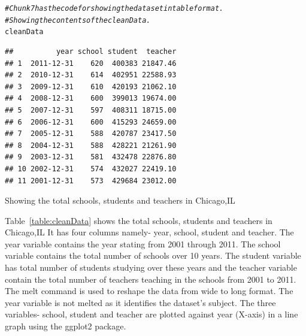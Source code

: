 \documentclass{article}\usepackage[]{graphicx}\usepackage[]{color}
\makeatletter
\newcommand{\hlcom}[1]{\textcolor[rgb]{0.678,0.584,0.686}{\textit{#1}}}%
\newcommand{\hlstd}[1]{\textcolor[rgb]{0.345,0.345,0.345}{#1}}%
\newenvironment{kframe}{%
 \def\at@end@of@kframe{}%
 \ifinner\ifhmode%
  \def\at@end@of@kframe{\end{minipage}}%
  \begin{minipage}{\columnwidth}%
 \fi\fi%
 \def\FrameCommand##1{\hskip\@totalleftmargin \hskip-\fboxsep
 \colorbox{shadecolor}{##1}\hskip-\fboxsep
     \hskip-\linewidth \hskip-\@totalleftmargin \hskip\columnwidth}%
 \MakeFramed {\advance\hsize-\width
   \@totalleftmargin\z@ \linewidth\hsize
   \@setminipage}}%
 {\par\unskip\endMakeFramed%
 \at@end@of@kframe}
\newenvironment{knitrout}{}{} %
\makeatother
\begin{document}
\begin{table}
\begin{knitrout}
\color{fgcolor}\begin{kframe}
\begin{alltt}
\hlcom{# Chunk 7 has the code for showing the dataset in table format.}
\hlcom{# Showing the contents of the cleanData.}
\hlstd{cleanData}
\end{alltt}
\begin{verbatim}
##          year school student  teacher
## 1  2011-12-31    620  400383 21847.46
## 2  2010-12-31    614  402951 22588.93
## 3  2009-12-31    610  420193 21062.10
## 4  2008-12-31    600  399013 19674.00
## 5  2007-12-31    597  408311 18715.00
## 6  2006-12-31    600  415293 24659.00
## 7  2005-12-31    588  420787 23417.50
## 8  2004-12-31    588  428221 21261.90
## 9  2003-12-31    581  432478 22876.80
## 10 2002-12-31    574  432027 22419.10
## 11 2001-12-31    573  429684 23012.00
\end{verbatim}
\end{kframe}
\end{knitrout}

    \caption{Showing the total schools, students and teachers in Chicago,IL}
  \label{table:cleanData}
\end{table}
Table~\ref{table:cleanData} shows the total schools, students and teachers in Chicago,IL
It has four columns namely- year, school, student and teacher. The year variable contains the year stating from 2001 through 2011. The school variable contains the total number of schools over 10 years. The student variable has total number of students studying over these years and the teacher variable contain the total number of teachers teaching in the schools from 2001 to 2011.\\
The melt command is used to reshape the data from wide to long format. The year variable is not melted as it identifies the dataset's subject.
The three variables- school, student and teacher are plotted against year (X-axis) in a line graph using the ggplot2 package.
\end{document}
